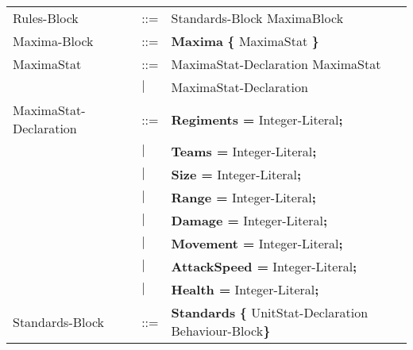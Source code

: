 \begin{center}
\begin{longtable}{l l l}
Rules-Block					&	::=	&Standards-Block MaximaBlock\\
Maxima-Block				&	::=	&{\bf Maxima} {\bf \{} MaximaStat {\bf \}} \\
MaximaStat				&	::=		&MaximaStat-Declaration MaximaStat\\
							&$\mid$	&MaximaStat-Declaration\\
MaximaStat-Declaration	&	::=	&{\bf Regiments = } Integer-Literal{\bf ;}\\
							&$\mid$	&{\bf Teams = } Integer-Literal{\bf ;}\\
							&$\mid$	&{\bf Size = } Integer-Literal{\bf ;}\\
							&$\mid$	&{\bf Range = } Integer-Literal{\bf ;}\\
							&$\mid$	&{\bf Damage = } Integer-Literal{\bf ;}\\
							&$\mid$	&{\bf Movement = } Integer-Literal{\bf ;}\\
							&$\mid$	&{\bf AttackSpeed = } Integer-Literal{\bf ;}\\
							&$\mid$	&{\bf Health = } Integer-Literal{\bf ;}\\
Standards-Block				&	::=	&{\bf Standards} {\bf \{ } UnitStat-Declaration Behaviour-Block\bf{\} }\\
\end{longtable}
\end{center}

